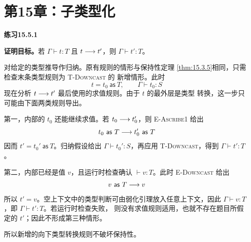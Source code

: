 \section*{第15章：子类型化}

\begin{taplsolutionentrybox}
\label{sol:translator:15.5.1}
\textbf{练习15.5.1}

\textbf{证明目标。}若 \(\Gamma\vdash t:T\) 且 \(t\mathrel{\longrightarrow} t'\)，则
\(\Gamma\vdash t':T\)。

对给定的类型推导作归纳。原有规则的情形与保持性定理
\cref{thm:15.3.5}相同，只需检查末条类型规则为 \textsc{T-Downcast} 的
新增情形。此时
\[
  t=t_0\ \mathsf{as}\ T,
  \qquad
  \Gamma\vdash t_0:S
\]
现在分析 \(t\mathrel{\longrightarrow} t'\) 最后使用的求值规则。由于 \(t\) 的最外层是类型
转换，这一步只可能由下面两类规则导出。

第一，内部的 \(t_0\) 还能继续求值。若 \(t_0\mathrel{\longrightarrow} t_0'\)，则
\textsc{E-Ascribe1} 给出
\[
  t_0\ \mathsf{as}\ T\trans t_0'\ \mathsf{as}\ T
\]
因而 \(t'=t_0'\ \mathsf{as}\ T\)。归纳假设给出
\(\Gamma\vdash t_0':S\)，再应用 \textsc{T-Downcast}，得到
\(\Gamma\vdash t':T\)。

第二，内部已经是值 \(v\)，且运行时检查确认 \(\vdash v:T\)。此时
\textsc{E-Downcast} 给出
\[
  v\ \mathsf{as}\ T\mathrel{\longrightarrow} v
\]
所以 \(t'=v\)。空上下文中的类型判断可由弱化引理放入任意上下文，因此
\(\Gamma\vdash v:T\)，即 \(\Gamma\vdash t':T\)。若运行时检查失败，
则没有求值规则适用，也就不存在题目所假定的 \(t'\)；因此不形成第三种情形。

所以新增的向下类型转换规则不破坏保持性。

\end{taplsolutionentrybox}

